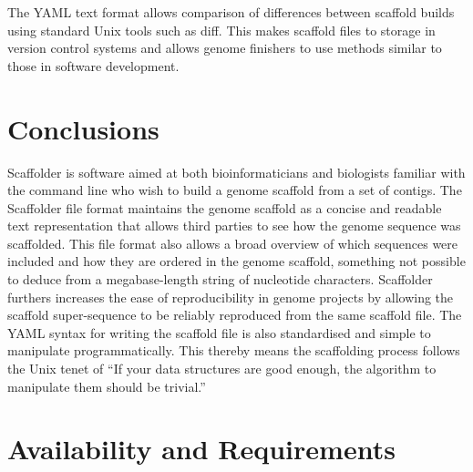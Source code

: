 \documentclass[10pt]{bmc_article}
\newenvironment{bmcformat}{\begin{raggedright}\baselineskip20pt\sloppy\setboolean{publ}{false}}{\end{raggedright}\baselineskip20pt\sloppy}
\begin{document}
\begin{bmcformat}
 \pb

The YAML text format  allows comparison of differences between
scaffold builds using standard Unix tools such as diff. This 
makes scaffold files  to storage in version control systems and
allows genome finishers to use methods similar to those in software
development. \pb 

\clearpage

\section*{Conclusions} %

Scaffolder is software aimed at both bioinformaticians and biologists familiar
with the command line who wish to build a genome scaffold from a set of
contigs. The Scaffolder file format maintains the genome scaffold as a concise
and readable text representation that allows third parties to see how the
genome sequence was scaffolded. This file format also allows a broad overview
of which sequences were included and how they are ordered in the genome
scaffold, something not possible to deduce from a megabase-length string of
nucleotide characters. Scaffolder furthers increases the ease of
reproducibility in genome projects by allowing the scaffold super-sequence to
be reliably reproduced from the same scaffold file. The YAML syntax for
writing the scaffold file is also standardised and simple to manipulate
programmatically. This thereby means the scaffolding process follows the Unix
tenet of ``If your data structures are good enough, the algorithm to
manipulate them should be trivial.''

\clearpage

\section*{Availability and Requirements} %


\end{bmcformat}
\end{document}
